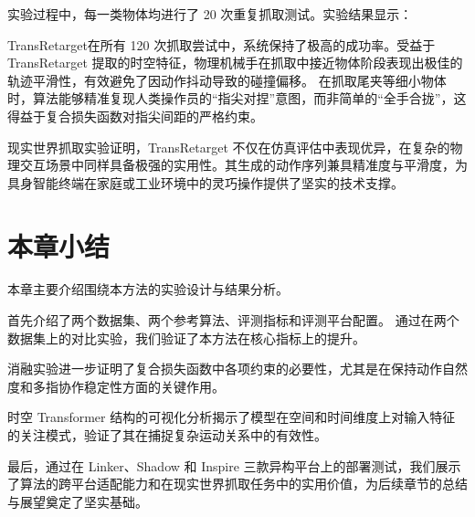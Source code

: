 实验过程中，每一类物体均进行了 20 次重复抓取测试。实验结果显示：

TransRetarget在所有 120 次抓取尝试中，系统保持了极高的成功率。受益于 TransRetarget 提取的时空特征，物理机械手在抓取中接近物体阶段表现出极佳的轨迹平滑性，有效避免了因动作抖动导致的碰撞偏移。
在抓取尾夹等细小物体时，算法能够精准复现人类操作员的“指尖对捏”意图，而非简单的“全手合拢”，这得益于复合损失函数对指尖间距的严格约束。

现实世界抓取实验证明，TransRetarget 不仅在仿真评估中表现优异，在复杂的物理交互场景中同样具备极强的实用性。其生成的动作序列兼具精准度与平滑度，为具身智能终端在家庭或工业环境中的灵巧操作提供了坚实的技术支撑。
\section{本章小结}
本章主要介绍围绕本方法的实验设计与结果分析。

首先介绍了两个数据集、两个参考算法、评测指标和评测平台配置。
通过在两个数据集上的对比实验，我们验证了本方法在核心指标上的提升。

消融实验进一步证明了复合损失函数中各项约束的必要性，尤其是在保持动作自然度和多指协作稳定性方面的关键作用。

时空 Transformer 结构的可视化分析揭示了模型在空间和时间维度上对输入特征的关注模式，验证了其在捕捉复杂运动关系中的有效性。

最后，通过在 Linker、Shadow 和 Inspire 三款异构平台上的部署测试，我们展示了算法的跨平台适配能力和在现实世界抓取任务中的实用价值，为后续章节的总结与展望奠定了坚实基础。